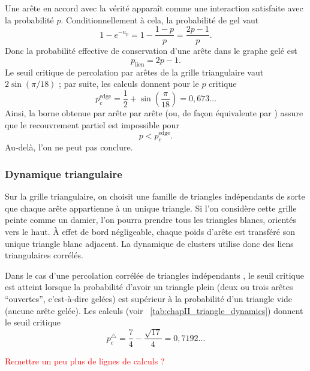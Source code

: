 Une arête en accord avec la vérité apparaît comme une interaction satisfaite avec la probabilité $p$. Conditionnellement à cela, la probabilité de gel vaut
\[
    1-e^{-u_p}=1-\frac{1-p}{p}=\frac{2p-1}{p}.
\]
Donc la probabilité effective de conservation d'une arête dans le graphe gelé est
\begin{equation}
    p_{\mathrm{lien}}=2p-1.
    \label{eq:chapII_plien_edges}
\end{equation}
Le seuil critique de percolation par arêtes de la grille triangulaire vaut $2\sin(\pi/18)$ \cite{Grimmett1999,Grimmett2006} ; par suite, les calculs donnent pour le $p$ critique
\begin{equation}
    p_c^{\mathrm{edge}}
    =
    \frac12+\sin\left(\frac\pi{18}\right)
    =0,673\ldots
    \label{eq:chapII_pc_edges}
\end{equation}
Ainsi, la borne obtenue par \SW{} arête par arête (ou, de façon équivalente par \SB{}) assure que le recouvrement partiel est impossible pour
\[
    p<p_c^{\mathrm{edge}}.
\]
Au-delà, l'on ne peut pas conclure.

\subsubsection{Dynamique triangulaire}

Sur la grille triangulaire, on choisit une famille de triangles indépendants de sorte que chaque arête appartienne à un unique triangle. Si l'on considère cette grille peinte comme un damier, l'on pourra prendre tous les triangles blancs, orientés vers le haut.
À effet de bord négligeable, chaque poids d'arête est transféré son unique triangle blanc adjacent. La dynamique de clusters utilise donc des liens triangulaires corrélés.

Dans le cas d'une percolation corrélée de triangles indépendants \cite{PercolationGrilleTrianglesCorrelations}, le seuil critique est atteint lorsque la probabilité d'avoir un triangle plein (deux ou trois arêtes ``ouvertes'', c'est-à-dire gelées) est supérieur à la probabilité d'un triangle vide (aucune arête gelée).
Les calculs (voir \Tab~\ref{tab:chapII_triangle_dynamics}) donnent le seuil critique
\begin{equation}
    p_c^{\triangle}
    =
    \frac74-\frac{\sqrt{17}}4
    =0,7192\ldots
    \label{eq:chapII_pc_triangles}
\end{equation}

\textcolor{red}{Remettre un peu plus de lignes de calculs ?}

